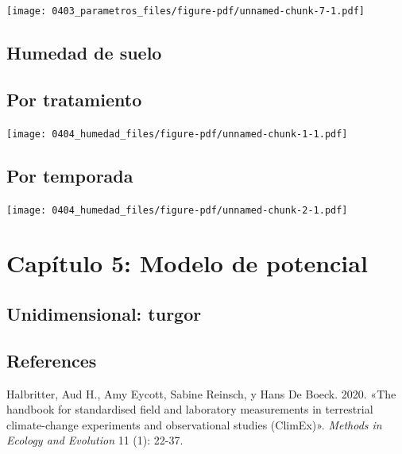 \documentclass[
  letterpaper,
  DIV=11,
  numbers=noendperiod]{scrreprt}
\newlength{\cslhangindent}
\newenvironment{CSLReferences}[2] %
 {\begin{list}{}{%
  \setlength{\itemindent}{0pt}
  \setlength{\leftmargin}{0pt}
  \setlength{\parsep}{0pt}
  \ifodd #1
   \setlength{\leftmargin}{\cslhangindent}
   \setlength{\itemindent}{-1\cslhangindent}
  \fi
  \setlength{\itemsep}{#2\baselineskip}}}
 {\end{list}}
\begin{document}
\begin{center}
\texttt{[image: 0403\_parametros\_files/figure-pdf/unnamed-chunk-7-1.pdf]}
\end{center}

\chapter{Humedad de suelo}\label{humedad-de-suelo-1}

\chapter{Por tratamiento}

\begin{center}
\texttt{[image: 0404\_humedad\_files/figure-pdf/unnamed-chunk-1-1.pdf]}
\end{center}

\chapter{Por temporada}

\begin{center}
\texttt{[image: 0404\_humedad\_files/figure-pdf/unnamed-chunk-2-1.pdf]}
\end{center}

\part{Capítulo 5: Modelo de potencial}

\chapter{Unidimensional: turgor}\label{unidimensional-turgor}


\chapter*{References}\label{references}


\label{refs}
\begin{CSLReferences}{1}{0}
Halbritter, Aud H., Amy Eycott, Sabine Reinsch, y Hans De Boeck. 2020.
{«The handbook for standardised field and laboratory measurements in
terrestrial climate-change experiments and observational studies
(ClimEx)»}. \emph{Methods in Ecology and Evolution} 11 (1): 22-37.

\end{CSLReferences}
\end{document}
